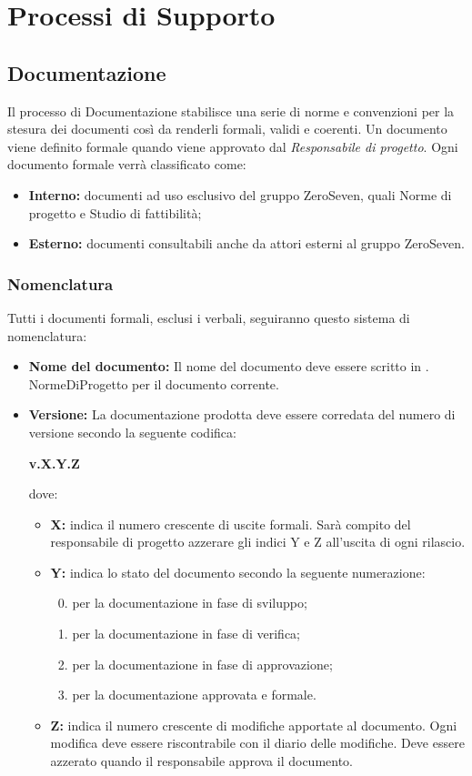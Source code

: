 \section{Processi di Supporto}
\subsection{Documentazione}
Il processo di Documentazione stabilisce una serie di norme e convenzioni per la stesura dei documenti così da renderli formali, validi e coerenti.
Un documento viene definito formale quando viene approvato dal \textit{Responsabile di progetto}.
Ogni documento formale verrà classificato come:
\begin{itemize}
	\item \textbf{Interno:} documenti ad uso esclusivo del gruppo ZeroSeven, quali Norme di progetto e Studio di fattibilità;
	\item \textbf{Esterno:} documenti consultabili anche da attori esterni al gruppo ZeroSeven.
	
\end{itemize}

\subsubsection{Nomenclatura}
Tutti i documenti formali, esclusi i verbali, seguiranno questo sistema di nomenclatura:
\begin{itemize}
	\item \textbf{Nome del documento:} Il nome del documento deve essere scritto in .
	NormeDiProgetto per il documento corrente. 
	\item \textbf{Versione:} La documentazione prodotta deve essere corredata del numero di versione secondo la seguente codifica:
	
	\textbf{v.X.Y.Z}
	
	dove:
	\begin{itemize}
		\item \textbf{X:} indica il numero crescente di uscite formali. Sarà compito del responsabile di progetto azzerare gli indici Y e Z all'uscita di ogni rilascio.
		\item \textbf{Y:} indica lo stato del documento secondo la seguente numerazione:
		\begin{enumerate}
			\setcounter{enumi}{-1}
			\item per la documentazione in fase di sviluppo;
			\item per la documentazione in fase di verifica;
			\item per la documentazione in fase di approvazione;
			\item per la documentazione approvata e formale.
		\end{enumerate}
		\item \textbf{Z:} indica il numero crescente di modifiche apportate al documento. Ogni modifica deve essere riscontrabile con il diario delle modifiche. Deve essere azzerato quando il responsabile approva il documento. 	
	\end{itemize}
\end{itemize}

